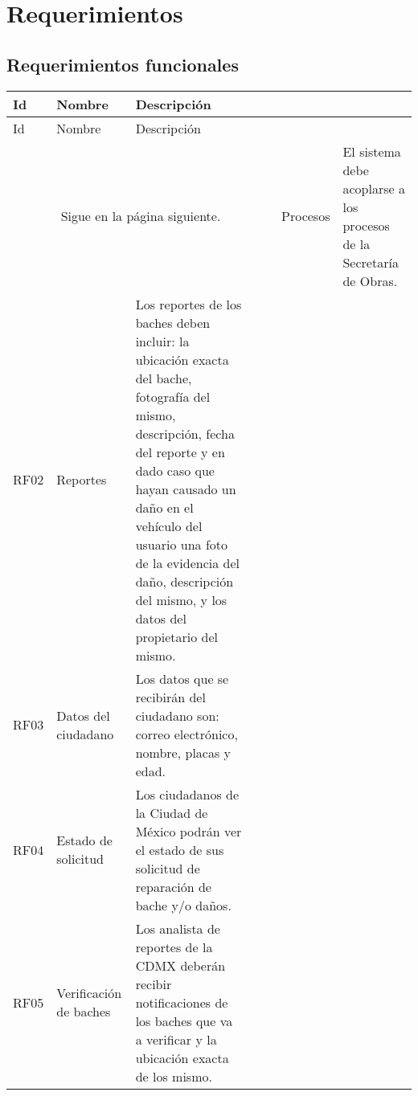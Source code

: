 \chapter{Requerimientos}

\section{Requerimientos funcionales}

\begin{longtable}{|m{1.5cm}|m{3cm}|m{5cm}|m{2cm}| m{2cm}|}
        \rowcolor[HTML]{3531FF} 
        {\color[HTML]{FFFFFF} Id} &{\color[HTML]{FFFFFF}Nombre} & {\color[HTML]{FFFFFF} Descripción}\\
        \hline
        \endfirsthead
        \hline
        \rowcolor[HTML]{3531FF} 
        {\color[HTML]{FFFFFF} Id} &{\color[HTML]{FFFFFF}Nombre} & {\color[HTML]{FFFFFF} Descripción}\\
        \hline 
        \endhead
        \multicolumn{5}{c}{Sigue en la página siguiente.}
        \endfoot
        \endlastfoot
        
        RF01 & Procesos & El sistema debe acoplarse a los procesos de la Secretaría de Obras. \\ \hline
        
        RF02 & Reportes & Los reportes de los baches deben incluir: la ubicación exacta del bache, fotografía del mismo, descripción, fecha del reporte y en dado caso que hayan causado un daño en el vehículo del usuario una foto de la evidencia del daño, descripción del mismo, y los datos del propietario del mismo.  \\ \hline
        RF03 & Datos del ciudadano & Los datos que se recibirán del ciudadano son: correo electrónico, nombre, placas y edad.  \\ \hline
        
        RF04 & Estado de solicitud & Los ciudadanos de la Ciudad de México podrán ver el estado de sus solicitud de reparación de bache y/o daños.\\ \hline
        
        RF05 & Verificación de baches &  Los analista de reportes de la CDMX  deberán recibir notificaciones de los baches que va a verificar y la ubicación exacta de los mismo.  \\ \hline
        

\end{longtable}
